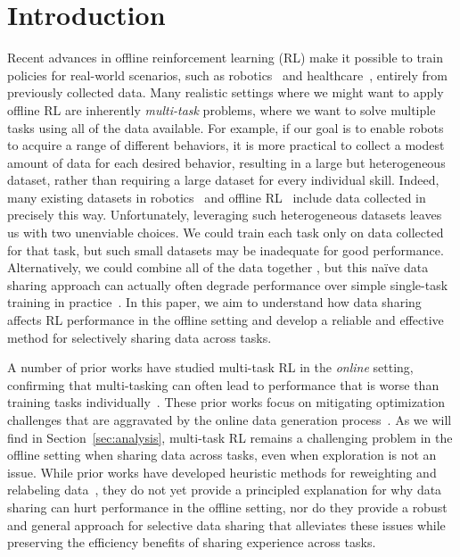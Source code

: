 \section{Introduction}

Recent advances in offline reinforcement learning (RL) make it possible to train policies for real-world scenarios, such as robotics~\citep{kalashnikov2018scalable,Rafailov2020LOMPO, kalashnikov2021mt} and healthcare~\citep{guez2008adaptive,shortreed2011informing,killian2020empirical}, entirely from previously collected data. Many realistic settings where we might want to apply offline RL are inherently \emph{multi-task} problems, where we want to solve multiple tasks using all of the data available. For example, if our goal is to enable robots to acquire a range of different behaviors, it is more practical to collect a modest amount of data for each desired behavior, resulting in a large but heterogeneous dataset, rather than requiring a large dataset for every individual skill. Indeed, many existing datasets in robotics~\citep{finn2017deep,dasari2020robonet,sharma2018multiple} and offline RL~\citep{fu2020d4rl} include data collected in precisely this way. Unfortunately, leveraging such heterogeneous datasets leaves us with two unenviable choices. We could train each task only on data collected for that task, but such small datasets may be inadequate for good performance. Alternatively, we could combine all of the data together , but this na\"{i}ve data sharing approach can actually often degrade performance over simple single-task training in practice~\citep{kalashnikov2021mt}. 
In this paper, we aim to understand how data sharing affects RL performance in the offline setting and develop a reliable and effective method for selectively sharing data across tasks.

A number of prior works have studied multi-task RL in the \emph{online} setting, confirming that multi-tasking can often lead to performance that is worse than training tasks individually~\cite{parisotto2015actor,rusu2015policy,yu2020metaworld}. These prior works focus on mitigating optimization challenges that are aggravated by the online data generation process~\cite{schaul2019ray,yu2020gradient,yang2020multi}. As we will find in Section~\ref{sec:analysis}, multi-task RL remains a challenging problem in the offline setting when sharing data across tasks, even when exploration is not an issue. While prior works have developed heuristic methods for reweighting and relabeling data~\citep{andrychowicz2017hindsight,eysenbach2020rewriting, li2020generalized,kalashnikov2021mt}, they do not yet provide a principled explanation for why data sharing can hurt performance in the offline setting, nor do they provide a robust and general approach for selective data sharing that alleviates these issues while preserving the efficiency benefits of sharing experience across tasks.


